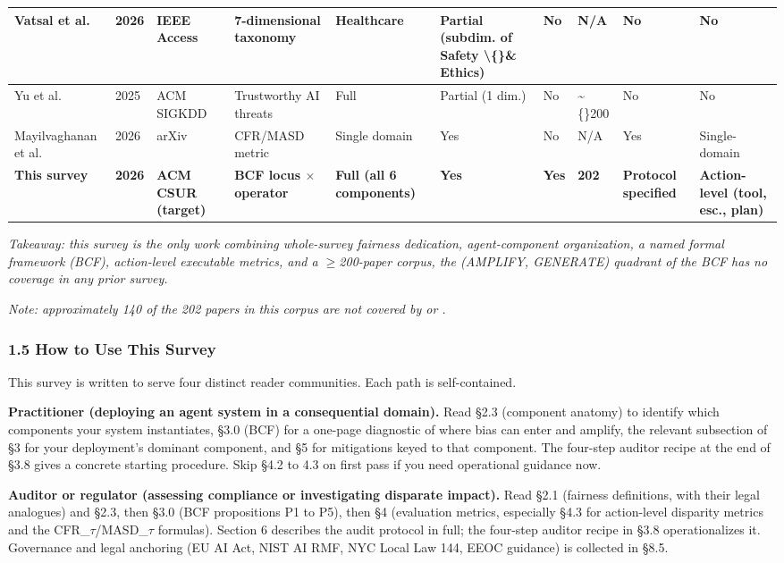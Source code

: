 \documentclass[10pt]{article}
\begin{document}
\begin{center}
\begin{longtable}{|p{}|p{}|p{}|p{}|p{}|p{}|p{}|p{}|p{}|p{}|}
Vatsal et al. \cite{vatsal2026agentic} & 2026 & IEEE Access & 7-dimensional taxonomy & Healthcare & Partial (subdim. of Safety \textbackslash\{\}\& Ethics) & No & N/A & No & No \\ \hline
Yu et al. \cite{yu2025survey} & 2025 & ACM SIGKDD & Trustworthy AI threats & Full & Partial (1 dim.) & No & \textasciitilde\{\}200 & No & No \\ \hline
Mayilvaghanan et al. \cite{mayilvaghanan2026counterfactual} & 2026 & arXiv & CFR/MASD metric & Single domain & Yes & No & N/A & Yes & Single-domain \\ \hline
\textbf{This survey} & \textbf{2026} & \textbf{ACM CSUR (target)} & \textbf{BCF locus $\times$ operator} & \textbf{Full (all 6 components)} & \textbf{Yes} & \textbf{Yes} & \textbf{202} & \textbf{Protocol specified} & \textbf{Action-level (tool, esc., plan)} \\ \hline
\end{longtable}\end{center}

\emph{Takeaway: this survey is the only work combining whole-survey fairness dedication, agent-component organization, a named formal framework (BCF), action-level executable metrics, and a $\geq$200-paper corpus, the (AMPLIFY, GENERATE) quadrant of the BCF has no coverage in any prior survey.}

\emph{Note: approximately 140 of the 202 papers in this corpus are not covered by \cite{gallegos2024bias} or \cite{chu2024fairness}.}


\subsubsection*{1.5 How to Use This Survey}

This survey is written to serve four distinct reader communities. Each path is self-contained.

\textbf{Practitioner (deploying an agent system in a consequential domain).} Read \S{}2.3 (component anatomy) to identify which components your system instantiates, \S{}3.0 (BCF) for a one-page diagnostic of where bias can enter and amplify, the relevant subsection of \S{}3 for your deployment's dominant component, and \S{}5 for mitigations keyed to that component. The four-step auditor recipe at the end of \S{}3.8 gives a concrete starting procedure. Skip \S{}4.2 to 4.3 on first pass if you need operational guidance now.

\textbf{Auditor or regulator (assessing compliance or investigating disparate impact).} Read \S{}2.1 (fairness definitions, with their legal analogues) and \S{}2.3, then \S{}3.0 (BCF propositions P1 to P5), then \S{}4 (evaluation metrics, especially \S{}4.3 for action-level disparity metrics and the CFR\_$\tau$/MASD\_$\tau$ formulas). Section 6 describes the audit protocol in full; the four-step auditor recipe in \S{}3.8 operationalizes it. Governance and legal anchoring (EU AI Act, NIST AI RMF, NYC Local Law 144, EEOC guidance) is collected in \S{}8.5.
\end{document}

